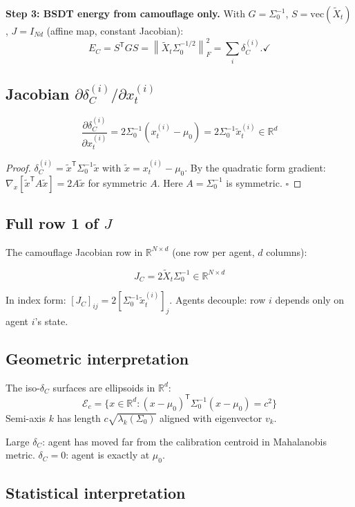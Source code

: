 \documentclass[11pt,a4paper]{article}
\theoremstyle{definition}
\newcommand{\R}{\mathbb{R}}
\newcommand{\T}{^{\mathsf{T}}}
\newcommand{\norm}[1]{\left\|#1\right\|}
\begin{document}
\textbf{Step 3: BSDT energy from camouflage only.}
With $G = \Sigma_0^{-1}$, $S = \mathrm{vec}(\tilde X_t)$, $J = I_{Nd}$ (affine map, constant Jacobian):
\[
E_C = S\T G S = \norm{\tilde X_t\Sigma_0^{-1/2}}_F^2 = \sum_i\delta_C^{(i)}. \checkmark
\]

\subsection{Jacobian $\partial\delta_C^{(i)}/\partial x_t^{(i)}$}

\begin{lockedbox}
\[
\frac{\partial\delta_C^{(i)}}{\partial x_t^{(i)}} = 2\Sigma_0^{-1}(x_t^{(i)}-\mu_0) = 2\Sigma_0^{-1}\tilde x_t^{(i)} \in \R^d
\]
\end{lockedbox}

\begin{proof}
$\delta_C^{(i)} = \tilde x\T\Sigma_0^{-1}\tilde x$ with $\tilde x = x_t^{(i)}-\mu_0$.
By the quadratic form gradient: $\nabla_x[\tilde x\T A\tilde x] = 2A\tilde x$ for symmetric $A$.
Here $A = \Sigma_0^{-1}$ is symmetric. $\square$
\end{proof}

\subsection{Full row 1 of $J$}

The camouflage Jacobian row in $\R^{N\times d}$ (one row per agent, $d$ columns):

\[
J_C = 2\tilde X_t\Sigma_0^{-1} \in \R^{N\times d}
\]

In index form: $[J_C]_{ij} = 2[\Sigma_0^{-1}\tilde x_t^{(i)}]_j$.
Agents decouple: row $i$ depends only on agent $i$'s state.

\subsection{Geometric interpretation}

The iso-$\delta_C$ surfaces are ellipsoids in $\R^d$:
\[
\mathcal{E}_c = \{x \in \R^d : (x-\mu_0)\T\Sigma_0^{-1}(x-\mu_0) = c^2\}
\]
Semi-axis $k$ has length $c\sqrt{\lambda_k(\Sigma_0)}$ aligned with eigenvector $v_k$.

Large $\delta_C$: agent has moved far from the calibration centroid in Mahalanobis metric.
$\delta_C = 0$: agent is exactly at $\mu_0$.

\subsection{Statistical interpretation}
\end{document}
